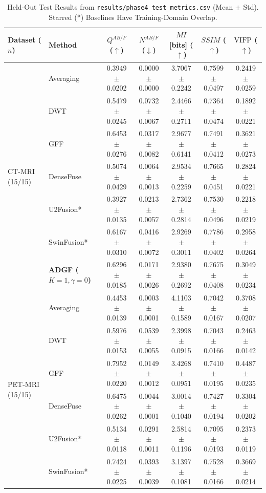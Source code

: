 \documentclass[conference]{IEEEtran}
\begin{document}
\begin{table}[htbp]
\caption{Held-Out Test Results from \texttt{results/phase4\_test\_metrics.csv} (Mean $\pm$ Std). Starred (*) Baselines Have Training-Domain Overlap.}
\label{tab:test_results}
\centering
\scriptsize
\begin{tabular}{llccccc}
\toprule
\textbf{Dataset ($n$)} & \textbf{Method} & $Q^{AB/F}$ ($\uparrow$) & $N^{AB/F}$ ($\downarrow$) & $MI$ [bits] ($\uparrow$) & $SSIM$ ($\uparrow$) & $\mathrm{VIFP}$ ($\uparrow$) \\
\midrule
\multirow{7}{*}{CT-MRI (15/15)}
& Averaging & 0.3949$\pm$0.0202 & 0.0000$\pm$0.0000 & 3.7067$\pm$0.2242 & 0.7599$\pm$0.0497 & 0.2419$\pm$0.0259 \\
& DWT & 0.5479$\pm$0.0245 & 0.0732$\pm$0.0067 & 2.4466$\pm$0.2711 & 0.7364$\pm$0.0474 & 0.1892$\pm$0.0221 \\
& GFF & 0.6453$\pm$0.0276 & 0.0317$\pm$0.0082 & 2.9677$\pm$0.6141 & 0.7491$\pm$0.0412 & 0.3621$\pm$0.0273 \\
& DenseFuse & 0.5074$\pm$0.0429 & 0.0064$\pm$0.0013 & 2.9534$\pm$0.2259 & 0.7665$\pm$0.0451 & 0.2824$\pm$0.0221 \\
& U2Fusion* & 0.3927$\pm$0.0135 & 0.0213$\pm$0.0057 & 2.7362$\pm$0.2814 & 0.7530$\pm$0.0496 & 0.2218$\pm$0.0219 \\
& SwinFusion* & 0.6167$\pm$0.0310 & 0.0416$\pm$0.0072 & 2.9269$\pm$0.3011 & 0.7786$\pm$0.0402 & 0.2958$\pm$0.0264 \\
& \textbf{ADGF ($K=1,\gamma=0$)} & 0.6296$\pm$0.0185 & 0.0171$\pm$0.0026 & 2.9380$\pm$0.2692 & 0.7675$\pm$0.0408 & 0.3049$\pm$0.0234 \\
\midrule
\multirow{7}{*}{PET-MRI (15/15)}
& Averaging & 0.4453$\pm$0.0139 & 0.0003$\pm$0.0001 & 4.1103$\pm$0.1589 & 0.7042$\pm$0.0167 & 0.3708$\pm$0.0207 \\
& DWT & 0.5976$\pm$0.0153 & 0.0539$\pm$0.0055 & 2.3998$\pm$0.0915 & 0.7043$\pm$0.0166 & 0.2463$\pm$0.0142 \\
& GFF & 0.7952$\pm$0.0220 & 0.0149$\pm$0.0012 & 3.4268$\pm$0.0951 & 0.7410$\pm$0.0195 & 0.4487$\pm$0.0235 \\
& DenseFuse & 0.6475$\pm$0.0262 & 0.0044$\pm$0.0001 & 3.0014$\pm$0.1040 & 0.7427$\pm$0.0194 & 0.3304$\pm$0.0202 \\
& U2Fusion* & 0.5134$\pm$0.0118 & 0.0291$\pm$0.0011 & 2.5814$\pm$0.1196 & 0.7095$\pm$0.0193 & 0.2373$\pm$0.0119 \\
& SwinFusion* & 0.7424$\pm$0.0225 & 0.0393$\pm$0.0039 & 3.1397$\pm$0.1081 & 0.7528$\pm$0.0166 & 0.3669$\pm$0.0214 \\

\end{tabular}
\end{table}
\end{document}
